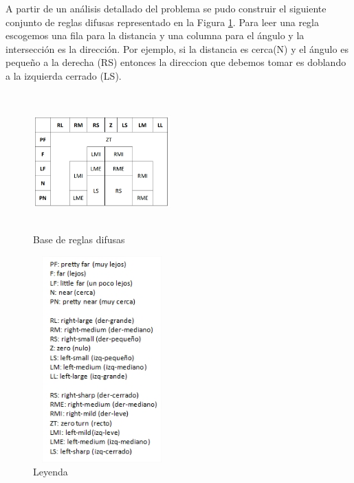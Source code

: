 \documentclass[a4paper,10pt]{article}
\begin{document}
		A partir de un análisis detallado del problema se pudo construir el siguiente conjunto de reglas difusas representado en la Figura \ref{fig:fuzzy_rule_base}.
	Para leer una regla escogemos una fila para la distancia y una columna para el ángulo y la intersección es la dirección. Por ejemplo, si la distancia es cerca(N) y el ángulo 		es pequeño a la derecha (RS) entonces la direccion que debemos tomar es doblando a la izquierda cerrado (LS). 
	
	\begin{figure}[htb]%
		\begin{center}
			\includegraphics[width=200px, height=200px]{images/fuzzy_rule_base.jpg}
		\end{center}
		\caption{Base de reglas difusas \label{fig:fuzzy_rule_base}}%
	\end{figure}
	
	\begin{figure}[htb]%
		\begin{center}
			\includegraphics[width=200px, height=300px]{images/terms_legend.jpg}
		\end{center}
		\caption{Leyenda \label{fig:terms_legend}}%
	\end{figure}
	
	
	
\end{document}

